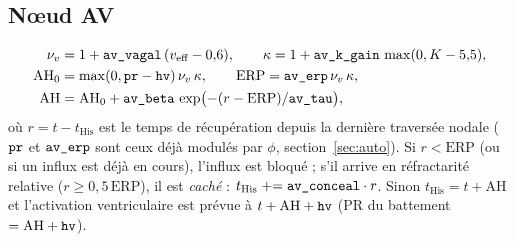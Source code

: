 \documentclass[10pt,a4paper]{article}
\newcommand{\vp}[1]{\text{\texttt{\detokenize{#1}}}}
\begin{document}
\subsection{Nœud AV}
\begin{align}
\nu_v &= 1 + \vp{av_vagal}\,(v_\text{eff} - 0{,}6), \qquad \kappa = 1 + \vp{av_k_gain}\,\max(0, K - 5{,}5),\\
\text{AH}_0 &= \max(0, \vp{pr} - \vp{hv})\,\nu_v\,\kappa, \qquad \text{ERP} = \vp{av_erp}\,\nu_v\,\kappa,\\
\text{AH} &= \text{AH}_0 + \vp{av_beta}\,\exp\bigl(-(r - \text{ERP})/\vp{av_tau}\bigr),
\end{align}
où $r = t - t_\text{His}$ est le temps de récupération depuis la dernière traversée nodale ($\vp{pr}$ et $\vp{av_erp}$ sont ceux déjà modulés par $\phi$, section~\ref{sec:auto}). Si $r < \text{ERP}$ (ou si un influx est déjà en cours), l'influx est bloqué ; s'il arrive en réfractarité relative ($r \ge 0{,}5\,\text{ERP}$), il est \emph{caché} : $t_\text{His} \mathrel{+}= \vp{av_conceal}\cdot r$. Sinon $t_\text{His} = t + \text{AH}$ et l'activation ventriculaire est prévue à $t + \text{AH} + \vp{hv}$ (PR du battement $= \text{AH} + \vp{hv}$).
\end{document}
